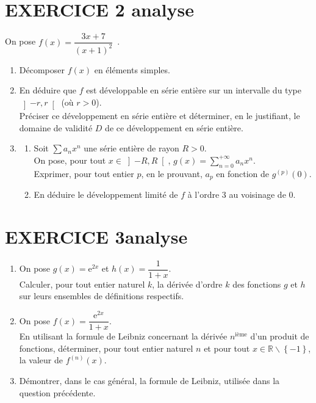 \documentclass[10pt,oneside]{article}
\begin{document}
\begin{flushleft}
\section*{EXERCICE 2 \:analyse }

On pose $f(x)=\dfrac{3x+7}{(x+1)^{2}}$~.
\begin{enumerate}
\item Décomposer $f(x)$ en éléments simples.

\item En déduire que $f$ est développable en série entière sur un intervalle du type $\left]-r,r \right[$ (où $r>0$).\\
Préciser ce développement en série entière et déterminer, en le justifiant, le domaine de validité $D$ de ce développement en série entière.\:\:\:\:\\

\item 
\begin{enumerate}
\item
Soit $\sum a_nx^n$ une série entière de rayon $R>0$.\\
On pose, pour tout $x\in \left]-R,R \right[ $, $g(x)=\displaystyle\sum_{n=0}^{+\infty}a_nx^n$.\\
Exprimer, pour tout entier $p$,  en le prouvant,  $a_p$ en fonction de $g^{(p)}(0)$.\\
\item
En déduire le développement limité de $f$ à l'ordre 3 au voisinage de 0.
\end{enumerate}

\end{enumerate}


\section*{EXERCICE 3\:analyse  }

\begin{enumerate}
\item
On pose $g(x)=\mathrm{e}^{2x}$ et $h(x)=\dfrac{1}{1+x}$.\\
Calculer, pour tout entier naturel $k$, la dérivée d'ordre $k$ des fonctions $g$ et $h$ sur leurs ensembles de définitions respectifs.
\item 
On pose $f(x)=\dfrac{\mathrm{e}^{2x}}{1+x}$.\\
En utilisant la formule de Leibniz concernant la dérivée $n^{\text{ième}}$ d'un produit de fonctions, déterminer, pour tout entier naturel $n$ et pour tout $x\in\mathbb{R}\backslash\left\lbrace -1\right\rbrace $, la valeur de $f^{(n)}(x)$.
\item 
Démontrer, dans le cas général, la formule de Leibniz, utilisée dans la question précédente.
\end{enumerate}


\end{flushleft}
\end{document}
